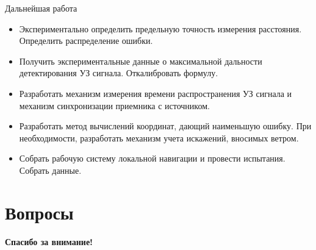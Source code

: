 \documentclass[xcolor=table,10pt]{beamer}
\begin{document}
\begin{frame}{Дальнейшая работа}
\centering 
\begin{itemize}
  \item Экспериментально определить предельную точность измерения расстояния. Определить распределение ошибки.
  \item Получить экспериментальные данные о максимальной дальности детектирования УЗ сигнала. Откалибровать формулу.
  \item Разработать механизм измерения времени распространения УЗ сигнала и механизм синхронизации приемника с источником.
  \item Разработать метод вычислений координат, дающий наименьшую ошибку. При необходимости, разработать механизм учета искажений, вносимых ветром.
  \item Собрать рабочую систему локальной навигации и провести испытания. Собрать данные.
  
\end{itemize}
\end{frame}

\section{\textbf{Вопросы}}
    
\begin{frame}
\centering 
{\bf Спасибо за внимание!}
\end{frame}
\end{document}
